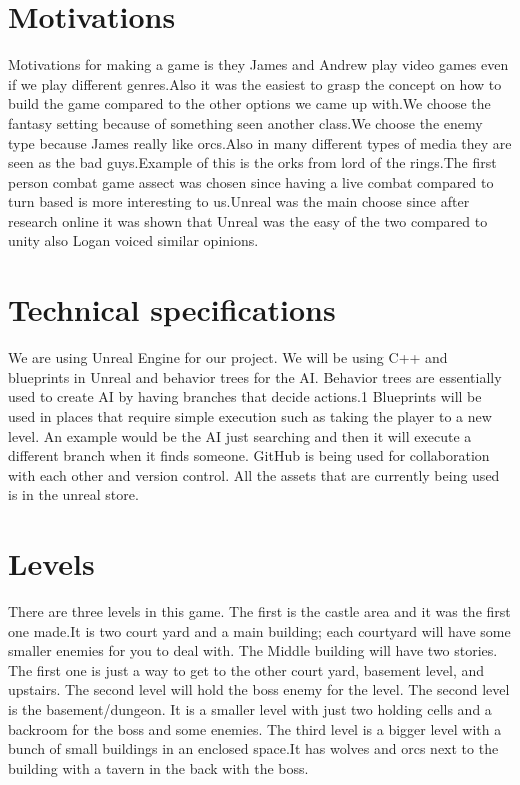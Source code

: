 \documentclass{sigchi}
\begin{document}
\section{Motivations}
Motivations for making a game is they James and Andrew play video games even if we play different genres.Also it was the easiest to grasp the concept on how to build the game compared to the other options we came up with.We choose the fantasy setting because of something seen another class.We choose the enemy type because James really like orcs.Also in many different types of media they are seen as the bad guys.Example of this is the orks from lord of the rings.The first person combat game assect was chosen since having a live combat compared to turn based is more interesting to us.Unreal was the main choose since after research online it was shown that Unreal was the easy of the two compared to unity also Logan voiced similar opinions.  
\section{Technical specifications}
We are using Unreal Engine for our project. We will be using C++ and blueprints in Unreal and behavior trees for the AI. Behavior trees are essentially used to create AI by having branches that decide actions.1 Blueprints will be used in places that require simple execution such as taking the player to a new level. An example would be the AI just searching and then it will execute a different branch when it finds someone. GitHub is being used for collaboration with each other and version control. All the assets that are currently being used is in the unreal store. 
\section{Levels}
There are three levels in this game. The first is the castle area and it was the first one made.It is two court yard and a main building; each courtyard will have some smaller enemies for you to deal with. The Middle building will have two stories. The first one is just a way to get to the other court yard, basement level, and upstairs. The second level will hold the boss enemy for the level. The second level is the basement/dungeon. It is a smaller level with just two holding cells and a backroom for the boss and some enemies. The third level is a bigger level with a bunch of small buildings in an enclosed space.It has wolves and orcs next to the building with a tavern in the back with the boss. 
\end{document}
